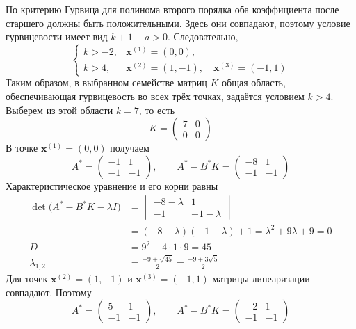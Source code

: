 По критерию Гурвица для полинома второго порядка оба коэффициента
после старшего должны быть положительными. Здесь они совпадают,
поэтому условие гурвицевости имеет вид $k+1-a>0$. Следовательно,
\begin{equation}
  \begin{cases}
    k>-2, & \bm x^{(1)}=(0,0),\\
    k>4, & \bm x^{(2)}=(1,-1),\quad \bm x^{(3)}=(-1,1)
  \end{cases}
\end{equation}
Таким образом, в выбранном семействе матриц $K$ общая область,
обеспечивающая гурвицевость во всех трёх точках, задаётся условием $k>4$.
Выберем из этой области $k=7$, то есть
\begin{equation}
  K=
  \begin{pmatrix}
    7 & 0\\
    0 & 0
  \end{pmatrix}
\end{equation}
В точке $\bm x^{(1)}=(0,0)$ получаем
\begin{equation}
  A^*=
  \begin{pmatrix}
    -1 & 1\\
    -1 & -1
  \end{pmatrix},
  \qquad
  A^*-B^*K=
  \begin{pmatrix}
    -8 & 1\\
    -1 & -1
  \end{pmatrix}
\end{equation}
Характеристическое уравнение и его корни равны
\begin{equation}
  \begin{aligned}
    \det\bigl(A^*-B^*K-\lambda I\bigr)
    &=\begin{vmatrix}
      -8-\lambda & 1\\
      -1 & -1-\lambda
    \end{vmatrix}\\
    &=(-8-\lambda)(-1-\lambda)+1
    =\lambda^2+9\lambda+9=0\\
    D&=9^2-4\cdot1\cdot9=45\\
    \lambda_{1,2}&=\frac{-9\pm\sqrt{45}}{2}
    =\frac{-9\pm3\sqrt{5}}{2}
  \end{aligned}
\end{equation}
Для точек $\bm x^{(2)}=(1,-1)$ и $\bm x^{(3)}=(-1,1)$ матрицы
линеаризации совпадают. Поэтому
\begin{equation}
  A^*=
  \begin{pmatrix}
    5 & 1\\
    -1 & -1
  \end{pmatrix},
  \qquad
  A^*-B^*K=
  \begin{pmatrix}
    -2 & 1\\
    -1 & -1
  \end{pmatrix}
\end{equation}
